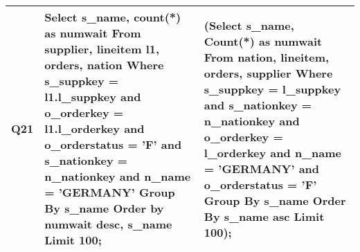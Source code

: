 {\begin{longtable}{|p{0.5cm}|p{7cm}|p{7cm}|}
Q21&
Select s\_name, count(*) as numwait From supplier, lineitem l1, orders, nation Where s\_suppkey = l1.l\_suppkey and o\_orderkey = l1.l\_orderkey and o\_orderstatus = 'F' and s\_nationkey = n\_nationkey and n\_name = 'GERMANY' Group By s\_name Order by numwait desc, s\_name Limit 100;&
(Select s\_name, Count(*) as numwait From nation, lineitem, orders, supplier Where s\_suppkey = l\_suppkey and s\_nationkey = n\_nationkey and o\_orderkey = l\_orderkey and n\_name  = 'GERMANY' and o\_orderstatus  = 'F' Group By s\_name Order By s\_name asc Limit 100);\\\hline
\end{longtable}}